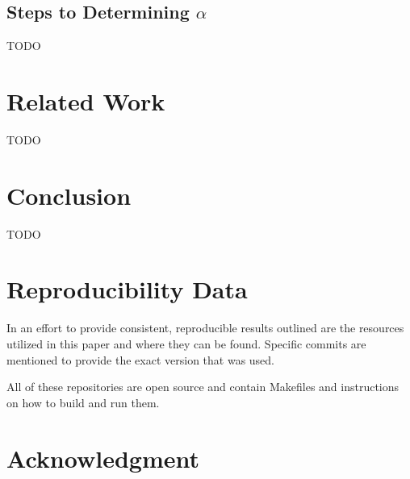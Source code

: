 \documentclass[sigconf]{acmart}
\begin{document}
\subsection{Steps to Determining $\alpha$}
TODO

\section{Related Work}
TODO

\section{Conclusion}
TODO

\section{Reproducibility Data}

In an effort to provide consistent, reproducible results outlined are the
resources utilized in this paper and where they can be found.
Specific commits are mentioned to provide the exact version that was used.


All of these repositories are open source and contain Makefiles
and instructions on how to build and run them.

\section*{Acknowledgment}




\end{document}
